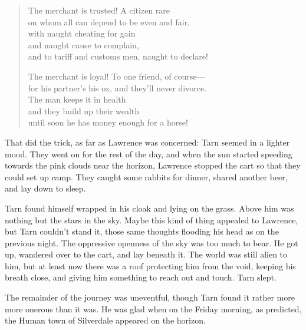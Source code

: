 \begin{verse}
The merchant is trusted!  A citizen rare\\
on whom all can depend to be even and fair,\\
\hspace{2em}with naught cheating for gain\\
\hspace{2em}and naught cause to complain,\\
and to tariff and customs men, naught to declare!

The merchant is loyal!  To one friend, of course---\\
for his partner's his ox, and they'll never divorce.\\
\hspace{2em}The man keeps it in health\\
\hspace{2em}and they build up their wealth\\
until soon he has money enough for a horse!
\end{verse}

That did the trick, as far as Lawrence was concerned: Tarn seemed in a lighter mood.  They went on for the rest of the day, and when the sun started speeding towards the pink clouds near the horizon, Lawrence stopped the cart so that they could set up camp.  They caught some rabbits for dinner, shared another beer, and lay down to sleep.

Tarn found himself wrapped in his cloak and lying on the grass.  Above him was nothing but the stars in the sky.  Maybe this kind of thing appealed to Lawrence, but Tarn couldn't stand it, those same thoughts flooding his head as on the previous night.  The oppressive openness of the sky was too much to bear.  He got up, wandered over to the cart, and lay beneath it.  The world was still alien to him, but at least now there was a roof protecting him from the void, keeping his breath close, and giving him something to reach out and touch.  Tarn slept.

The remainder of the journey was uneventful, though Tarn found it rather more more onerous than it was.  He was glad when on the Friday morning, as predicted, the Human town of Silverdale appeared on the horizon.